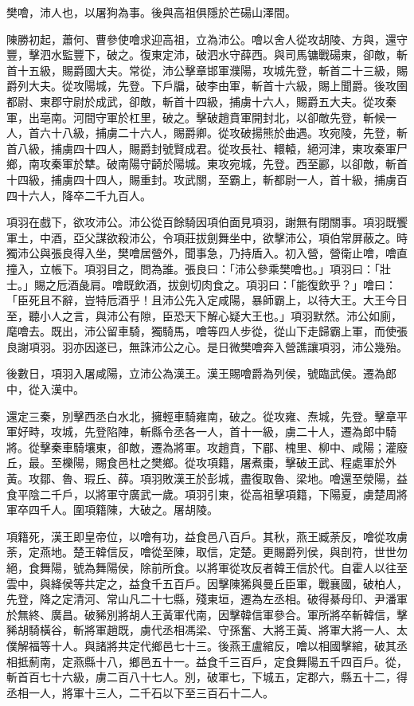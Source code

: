 
\begin{pinyinscope}
樊噲，沛人也，以屠狗為事。後與高祖俱隱於芒碭山澤間。

陳勝初起，蕭何、曹參使噲求迎高祖，立為沛公。噲以舍人從攻胡陵、方與，還守豐，擊泗水監豐下，破之。復東定沛，破泗水守薛西。與司馬镛戰碭東，卻敵，斬首十五級，賜爵國大夫。常從，沛公擊章邯軍濮陽，攻城先登，斬首二十三級，賜爵列大夫。從攻陽城，先登。下戶牖，破李由軍，斬首十六級，賜上聞爵。後攻圉都尉、東郡守尉於成武，卻敵，斬首十四級，捕虜十六人，賜爵五大夫。從攻秦軍，出亳南。河間守軍於杠里，破之。擊破趙賁軍開封北，以卻敵先登，斬候一人，首六十八級，捕虜二十六人，賜爵卿。從攻破揚熊於曲遇。攻宛陵，先登，斬首八級，捕虜四十四人，賜爵封號賢成君。從攻長社、轘轅，絕河津，東攻秦軍尸鄉，南攻秦軍於犨。破南陽守齮於陽城。東攻宛城，先登。西至酈，以卻敵，斬首十四級，捕虜四十四人，賜重封。攻武關，至霸上，斬都尉一人，首十級，捕虜百四十六人，降卒二千九百人。

項羽在戲下，欲攻沛公。沛公從百餘騎因項伯面見項羽，謝無有閉關事。項羽既饗軍土，中酒，亞父謀欲殺沛公，令項莊拔劍舞坐中，欲擊沛公，項伯常屏蔽之。時獨沛公與張良得入坐，樊噲居營外，聞事急，乃持盾入。初入營，營衛止噲，噲直撞入，立帳下。項羽目之，問為誰。張良曰：「沛公參乘樊噲也。」項羽曰：「壯士。」賜之卮酒彘肩。噲既飲酒，拔劍切肉食之。項羽曰：「能復飲乎？」噲曰：「臣死且不辭，豈特卮酒乎！且沛公先入定咸陽，暴師霸上，以待大王。大王今日至，聽小人之言，與沛公有隙，臣恐天下解心疑大王也。」項羽默然。沛公如廁，麾噲去。既出，沛公留車騎，獨騎馬，噲等四人步從，從山下走歸霸上軍，而使張良謝項羽。羽亦因遂已，無誅沛公之心。是日微樊噲奔入營譙讓項羽，沛公幾殆。

後數日，項羽入屠咸陽，立沛公為漢王。漢王賜噲爵為列侯，號臨武侯。遷為郎中，從入漢中。

還定三秦，別擊西丞白水北，擁輕車騎雍南，破之。從攻雍、焘城，先登。擊章平軍好畤，攻城，先登陷陣，斬縣令丞各一人，首十一級，虜二十人，遷為郎中騎將。從擊秦車騎壤東，卻敵，遷為將軍。攻趙賁，下郿、槐里、柳中、咸陽；灌廢丘，最。至櫟陽，賜食邑杜之樊鄉。從攻項籍，屠煮棗，擊破王武、程處軍於外黃。攻鄒、魯、瑕丘、薛。項羽敗漢王於彭城，盡復取魯、梁地。噲還至滎陽，益食平陰二千戶，以將軍守廣武一歲。項羽引東，從高祖擊項籍，下陽夏，虜楚周將軍卒四千人。圍項籍陳，大破之。屠胡陵。

項籍死，漢王即皇帝位，以噲有功，益食邑八百戶。其秋，燕王臧荼反，噲從攻虜荼，定燕地。楚王韓信反，噲從至陳，取信，定楚。更賜爵列侯，與剖符，世世勿絕，食舞陽，號為舞陽侯，除前所食。以將軍從攻反者韓王信於代。自霍人以往至雲中，與絳侯等共定之，益食千五百戶。因擊陳狶與曼丘臣軍，戰襄國，破柏人，先登，降之定清河、常山凡二十七縣，殘東垣，遷為左丞相。破得綦母印、尹潘軍於無終、廣昌。破豨別將胡人王黃軍代南，因擊韓信軍參合。軍所將卒斬韓信，擊豨胡騎橫谷，斬將軍趙既，虜代丞相馮梁、守孫奮、大將王黃、將軍大將一人、太僕解福等十人。與諸將共定代鄉邑七十三。後燕王盧綰反，噲以相國擊綰，破其丞相抵薊南，定燕縣十八，鄉邑五十一。益食千三百戶，定食舞陽五千四百戶。從，斬首百七十六級，虜二百八十七人。別，破軍七，下城五，定郡六，縣五十二，得丞相一人，將軍十三人，二千石以下至三百石十二人。


\end{pinyinscope}
